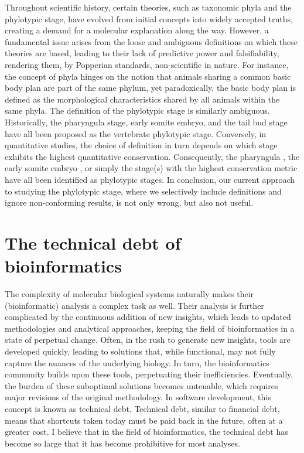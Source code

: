 Throughout scientific history, certain theories, such as taxonomic phyla and the phylotypic stage, have evolved from initial concepts into widely accepted truths, creating a demand for a molecular explanation along the way. However, a fundamental issue arises from the loose and ambiguous definitions on which these theories are based, leading to their lack of predictive power and falsifiability, rendering them, by Popperian standards, non-scientific in nature. For instance, the concept of phyla hinges on the notion that animals sharing a common basic body plan are part of the same phylum, yet paradoxically, the basic body plan is defined as the morphological characteristics shared by all animals within the same phyla\cite{BUDD2000,scholtz2004bauplane}. The definition of the phylotypic stage is similarly ambiguous\cite{Richardson1998}. Historically, the pharyngula stage\cite{BALLARD1981}, early somite embryo\cite{Alberch1993}, and the tail bud stage \cite{Slack1993} have all been proposed as the vertebrate phylotypic stage. Conversely, in quantitative studies, the choice of definition in turn depends on which stage exhibits the highest quantitative conservation. Consequently, the pharyngula \cite{Irie2011,marletaz2018,Piasecka2013}, the early somite embryo \cite{DomazetLoso2010}, or simply the stage(s) with the highest conservation metric\cite{Kalinka2010,Cordero2020,Mayshar2023} have all been identified as phylotypic stages. In conclusion, our current approach to studying the phylotypic stage, where we selectively include definitions and ignore non-conforming results, is not only wrong, but also not useful.

\section{The technical debt of bioinformatics}

The complexity of molecular biological systems naturally makes their (bioinformatic) analysis a complex task as well. Their analysis is further complicated by the continuous addition of new insights, which leads to updated methodologies and analytical approaches, keeping the field of bioinformatics in a state of perpetual change. Often, in the rush to generate new insights, tools are developed quickly, leading to solutions that, while functional, may not fully capture the nuances of the underlying biology. In turn, the bioinformatics community builds upon these tools, perpetuating their inefficiencies\cite{Ferenc2022,Killcoyne_2009}. Eventually, the burden of these suboptimal solutions becomes untenable, which requires major revisions of the original methodology. In software development, this concept is known as technical debt. Technical debt, similar to financial debt, means that shortcuts taken today must be paid back in the future, often at a greater cost. I believe that in the field of bioinformatics, the technical debt has become so large that it has become prohibitive for most analyses.

